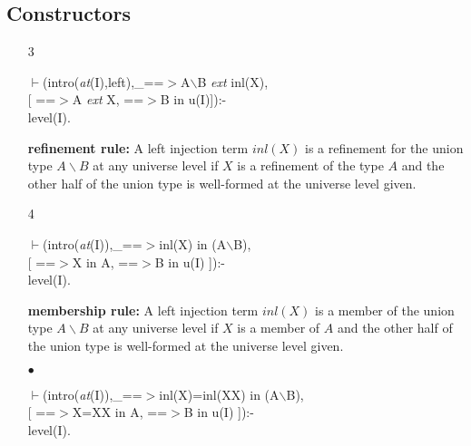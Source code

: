 \documentclass[11pt]{report}
\begin{document}
 \subsection{Constructors}
  
 \begin{enumerate}
 \item[3]
\begin{sf}\begin{tabbing}
$\vdash$(intro(\mbox{\it at}(I),left),\_\hspace{0.1em}==$>$A$\backslash$B \mbox{\it ext} inl(X), \\[-0.15ex]
\hspace{2em}[ ==$>$A \mbox{\it ext} X, ==$>$B in u(I)]):-\\[-0.15ex]
\hspace{2em}level(I).
\end{tabbing}\end{sf}

 {\bf refinement rule:}
 A left injection term $inl(X)$ is a refinement for the union type
 $A\backslash B$ at any universe level
 if $X$ is a refinement of the type $A$ and the
 other half of the union type is well-formed at the universe level given. 
  
 \item[4]
\begin{sf}\begin{tabbing}
$\vdash$(intro(\mbox{\it at}(I)),\_\hspace{0.1em}==$>$inl(X) in (A$\backslash$B), \\[-0.15ex]
\hspace{2em}[ ==$>$X in A, ==$>$B in u(I) ]):-\\[-0.15ex]
\hspace{2em}level(I).
\end{tabbing}\end{sf}

 {\bf membership rule:}
 A left injection term $inl(X)$ is a member of the union type
 $A\backslash B$ at any universe level
 if $X$ is a member of $A$ and the
 other half of the union type is well-formed at the universe level given. 
  
 \item[$\bullet$]
\begin{sf}\begin{tabbing}
$\vdash$(intro(\mbox{\it at}(I)),\_\hspace{0.1em}==$>$inl(X)=inl(XX) in (A$\backslash$B),\\[-0.15ex]
\hspace{2em}[ ==$>$X=XX in A, ==$>$B in u(I) ]):-\\[-0.15ex]
\hspace{2em}level(I).
\end{tabbing}\end{sf}


\end{enumerate}
\end{document}
